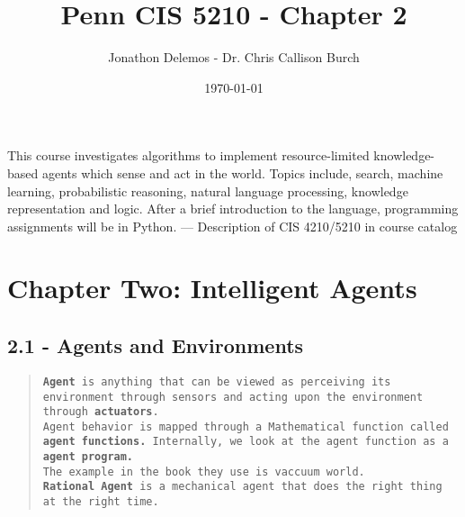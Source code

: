 \documentclass{article}
\title{Penn CIS 5210 - Chapter 2}
\author{Jonathon Delemos - Dr. Chris Callison Burch}
\date{\today}
\begin{document}
\maketitle

This course investigates algorithms to implement resource-limited knowledge-based agents which
sense and act in the world. Topics include, search, machine learning, probabilistic reasoning, natural
language processing, knowledge representation and logic. After a brief introduction to the language,
programming assignments will be in Python.
— Description of CIS 4210/5210 in course catalog

\section{Chapter Two: Intelligent Agents}
\subsection{2.1 - Agents and Environments}
\begin{quote}
    \texttt{\textbf{Agent} is anything that can be viewed as perceiving its environment through sensors and acting upon the environment through \textbf{actuators}.
        \\ Agent behavior is mapped through a Mathematical function called \textbf{agent functions.} Internally, we look at the agent function as a \textbf{agent program.}
        \\The example in the book they use is vaccuum world. \\ \textbf{Rational Agent} is a mechanical agent that does the right thing at the right time.}
\end{quote}
\end{document}
